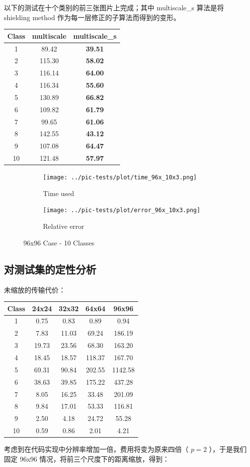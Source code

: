 \documentclass[]{article}
\begin{document}
以下的测试在十个类别的前三张图片上完成；其中 multiscale\_s 算法是将
shielding method 作为每一层修正的子算法而得到的变形。

\begin{longtable}[]{@{}c|cc@{}}
\hline
Class & multiscale & multiscale\_s\tabularnewline
\hline
1 & 89.42 & \textbf{39.51}\tabularnewline
2 & 115.30 & \textbf{58.02}\tabularnewline
3 & 116.14 & \textbf{64.00}\tabularnewline
4 & 116.34 & \textbf{55.60}\tabularnewline
5 & 130.89 & \textbf{66.82}\tabularnewline
6 & 109.82 & \textbf{61.79}\tabularnewline
7 & 99.65 & \textbf{61.06}\tabularnewline
8 & 142.55 & \textbf{43.12}\tabularnewline
9 & 107.08 & \textbf{64.47}\tabularnewline
10 & 121.48 & \textbf{57.97}\tabularnewline
\hline
\end{longtable}
\begin{figure}[htpb]
	\centering
	\begin{subfigure}{0.49 \textwidth}
		\centering
		\texttt{[image: ../pic-tests/plot/time\_96x\_10x3.png]}
		\caption{Time used}
	\end{subfigure}
	\begin{subfigure}{0.49 \textwidth}
		\centering
		\texttt{[image: ../pic-tests/plot/error\_96x\_10x3.png]}
		\caption{Relative error}
	\end{subfigure}
	\caption{96x96 Case - 10 Classes}
\end{figure}

\subsection{对测试集的定性分析}

未缩放的传输代价：

\begin{longtable}[]{@{}c|cccc@{}}
\hline
Class & 24x24 & 32x32 & 64x64 & 96x96\tabularnewline
\hline
1 & 0.75 & 0.83 & 0.89 & 0.94\tabularnewline
2 & 7.83 & 11.03 & 69.24 & 186.19\tabularnewline
3 & 19.73 & 23.56 & 68.30 & 163.20\tabularnewline
4 & 18.45 & 18.57 & 118.37 & 167.70\tabularnewline
5 & 69.31 & 90.84 & 202.55 & 1142.58\tabularnewline
6 & 38.63 & 39.85 & 175.22 & 437.28\tabularnewline
7 & 8.05 & 16.25 & 33.48 & 201.09\tabularnewline
8 & 9.84 & 17.01 & 53.33 & 116.81\tabularnewline
9 & 2.50 & 4.18 & 24.72 & 55.28\tabularnewline
10 & 0.59 & 0.86 & 2.01 & 4.21\tabularnewline
\hline
\end{longtable}

考虑到在代码实现中分辨率增加一倍，费用将变为原来四倍（ \(p=2\)
），于是我们固定 96x96 情况，将前三个尺度下的距离缩放，得到：
\end{document}
